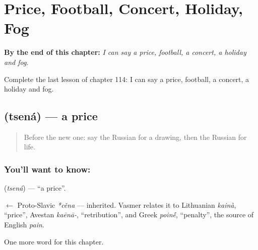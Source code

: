 
\chapter{Price, Football, Concert, Holiday, Fog}
\label{ch:ru-price-football-concert-holiday-fog}

\begin{chapteropening}
\textbf{By the end of this chapter:} \emph{I can say a price, football, a concert, a holiday and fog.}

Complete the last lesson of chapter 114: I can say a price, football, a concert, a holiday and fog.
\end{chapteropening}

\section[\texorpdfstring{\ru{цена} (tsená)}{цена (tsená)}]{ (tsená) — a price}

\label{lesson:RU-C114-price}



\begin{quote}
Before the new one: say the Russian for a drawing, then the Russian for life.
\end{quote}

\subsection*{You'll want to know: }
\textbf{} (\emph{tsená}) — \textquotedblleft{}a price\textquotedblright{}.

\begin{cousinweb}
\textbf{} $\leftarrow$ Proto-Slavic \emph{*cěna} — inherited. Vasmer relates it to Lithuanian \emph{kainà}, \textquotedblleft{}price\textquotedblright{}, Avestan \emph{kaēnā-}, \textquotedblleft{}retribution\textquotedblright{}, and Greek \emph{poin\'{\={e}}}, \textquotedblleft{}penalty\textquotedblright{}, the source of English \emph{pain}.
\end{cousinweb}

\begin{grammarlens}[title={What you've built}]
One more word for this chapter.
\end{grammarlens}

